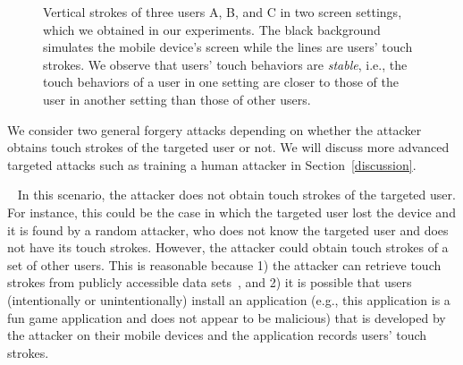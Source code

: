 \documentclass{sig-alternate-05-2015}
\newcommand{\myparatight}[1]{\smallskip\noindent{\bf {#1}:}~}
\begin{document}
\begin{figure*}[!t]
\centering
{}
\hspace{8mm}
\hspace{8mm}

\hspace{8mm}
\hspace{8mm}
\caption{Vertical strokes of three users A, B, and C in two screen settings, which we obtained in our experiments. 
The black background simulates the mobile device's screen while the lines are users' touch strokes.  We observe that users' touch
 behaviors are \emph{stable}, i.e., the touch behaviors of a user in one setting
are closer to those of the user in another setting than those of other users.}
\label{stroke} 
\end{figure*}

We consider two general forgery attacks depending on whether the attacker obtains touch
strokes of the targeted user or not. 
 We will discuss more advanced targeted attacks such as training a human attacker in Section~\ref{discussion}.


\myparatight{Random attacks} In this scenario, the attacker does not obtain
touch strokes of the targeted user. For instance, this could be the case in
which the targeted user lost the device and it is found by a random
attacker, who does not know the targeted user and does not have its touch
strokes.  However, the attacker could obtain touch strokes of a set of other
users. This is reasonable because 1) the attacker can retrieve touch strokes
from publicly accessible data sets~\cite{frank2013touchalytics,attack-CCS13},
and 2) it is possible that users (intentionally or unintentionally) install  an
application (e.g., this application is a fun game application and  does not
appear to be malicious) that is developed by the attacker on their mobile devices 
and the application records users' touch strokes.  
\end{document}
